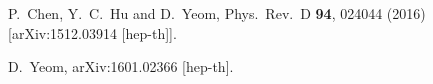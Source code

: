 \documentclass[preprintnumbers,10pt,nofootinbib]{revtex4}
\begin{document}
\begin{thebibliography}{200}
  P.~Chen, Y.~C.~Hu and D.~Yeom,
  Phys.\ Rev.\ D {\bf 94}, 024044 (2016)
  [arXiv:1512.03914 [hep-th]].

  D.~Yeom,
  arXiv:1601.02366 [hep-th].

\end{thebibliography}
\end{document}
